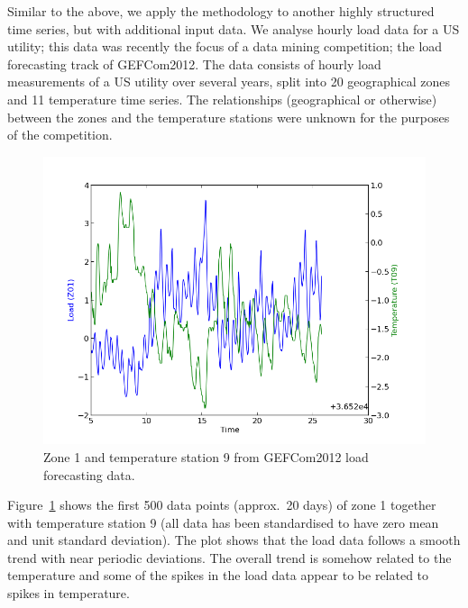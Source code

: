 \documentclass[twoside]{article}
\begin{document}
Similar to the above, we apply the methodology to another highly structured time series, but with additional input data.
We analyse hourly load data for a US utility; this data was recently the focus of a data mining competition; the load forecasting track of GEFCom2012\footnotemark.
The data consists of hourly load measurements of a US utility over several years, split into 20 geographical zones and 11 temperature time series.
The relationships (geographical or otherwise) between the zones and the temperature stations were unknown for the purposes of the competition.

\begin{figure}
\includegraphics[width=\columnwidth]{../figures/gef_load_z01_t09_500}
\caption{Zone 1 and temperature station 9 from GEFCom2012 load forecasting data.}
\label{fig:gef_z01_t09}
\end{figure}

Figure~\ref{fig:gef_z01_t09} shows the first 500 data points (approx.~20 days) of zone 1 together with temperature station 9 (all data has been standardised to have zero mean and unit standard deviation).
The plot shows that the load data follows a smooth trend with near periodic deviations.
The overall trend is somehow related to the temperature and some of the spikes in the load data appear to be related to spikes in temperature.
\end{document}
